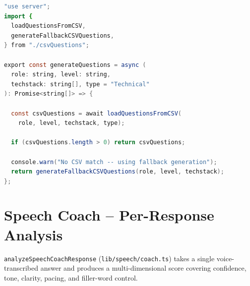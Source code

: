 \begin{lstlisting}[language=Java,
  caption={Question-generation entry point
           (\texttt{lib/interview/questionGenerator.ts})},
  label={lst:questionGenerator}]
"use server";
import {
  loadQuestionsFromCSV,
  generateFallbackCSVQuestions,
} from "./csvQuestions";

export const generateQuestions = async (
  role: string, level: string,
  techstack: string[], type = "Technical"
): Promise<string[]> => {

  const csvQuestions = await loadQuestionsFromCSV(
    role, level, techstack, type);

  if (csvQuestions.length > 0) return csvQuestions;

  console.warn("No CSV match -- using fallback generation");
  return generateFallbackCSVQuestions(role, level, techstack);
};
\end{lstlisting}

\section{Speech Coach -- Per-Response Analysis}
\label{app:speech-coach}

\texttt{analyzeSpeechCoachResponse} (\texttt{lib/speech/coach.ts}) takes a
single voice-transcribed answer and produces a multi-dimensional score covering
confidence, tone, clarity, pacing, and filler-word control.

